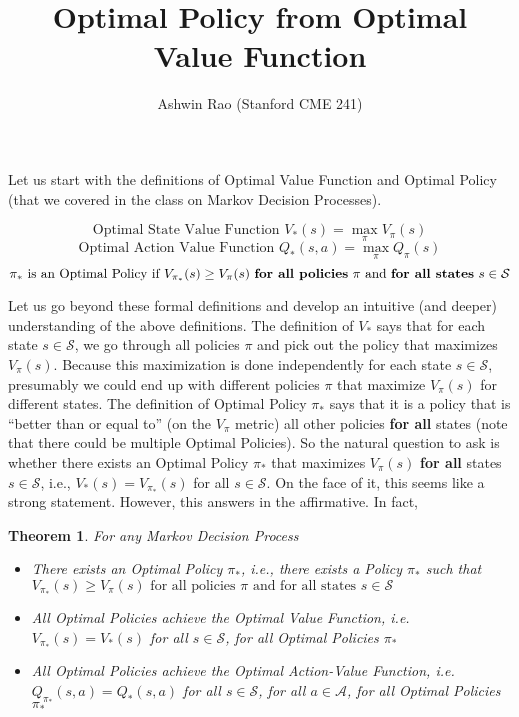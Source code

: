 \documentclass[12pt]{amsart}
\title{Optimal Policy from Optimal Value Function}
\author{Ashwin Rao (Stanford CME 241)}
\date{} %
\newtheorem{theorem}{Theorem}
\begin{document}
\maketitle
Let us start with the definitions of Optimal Value Function and Optimal Policy (that we covered in the class on Markov Decision Processes).

$$\mbox{Optimal State Value Function } V_*(s) = \max_{\pi} V_{\pi}(s)$$
$$\mbox{Optimal Action Value Function } Q_*(s,a) = \max_{\pi} Q_{\pi}(s)$$
$$\pi_* \mbox{ is an Optimal Policy if } V_{\pi_*}(s) \geq V_{\pi}(s) \mbox{ {\bf for all policies} } \pi \mbox{ and {\bf for all states} } s \in \mathcal{S}$$ 

Let us go beyond these formal definitions and develop an intuitive (and deeper) understanding of the above definitions. The definition of $V_*$ says that for each state $s \in \mathcal{S}$, we go through all policies $\pi$ and pick out the policy that maximizes $V_{\pi}(s)$. Because this maximization is done independently for each state $s \in \mathcal{S}$, presumably we could end up with different policies $\pi$ that maximize $V_{\pi}(s)$ for different states. The definition of 
Optimal Policy $\pi_*$ says that it is a policy that is ``better than or equal to'' (on the $V_{\pi}$ metric) all other policies {\bf for all} states (note that there could be multiple Optimal Policies). So the natural question to ask is whether there exists an Optimal Policy $\pi_*$ that maximizes $V_{\pi}(s)$  {\bf for all} states $s \in \mathcal{S}$, i.e., $V_*(s) = V_{\pi_*}(s)$ for all $s \in \mathcal{S}$. On the face of it, this seems like a strong statement. However, this answers in the affirmative. In fact,

\begin{theorem}
For any Markov Decision Process
\begin{itemize}
\item There exists an Optimal Policy $\pi_*$, i.e., there exists a Policy $\pi_*$ such that $V_{\pi_*}(s) \geq V_{\pi}(s) \mbox{ for all policies  } \pi \mbox{ and for all states } s \in \mathcal{S}$
\item All Optimal Policies achieve the Optimal Value Function, i.e. $V_{\pi_*}(s) = V_*(s)$ for all $s \in \mathcal{S}$, for all Optimal Policies $\pi_*$
\item All Optimal Policies achieve the Optimal Action-Value Function, i.e. $Q_{\pi_*}(s,a) = Q_*(s,a)$ for all $s \in \mathcal{S}$, for all $a \in \mathcal{A}$, for all Optimal Policies $\pi_*$
\end{itemize}
\end{theorem}
\end{document}
